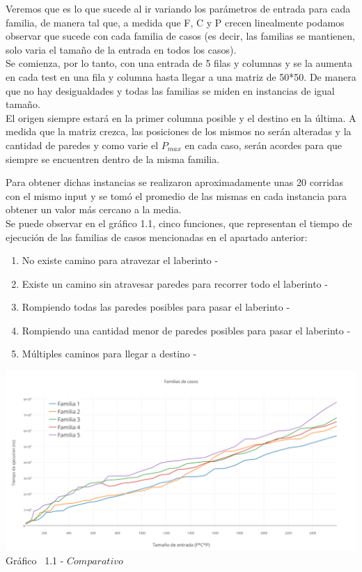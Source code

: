 \indent Veremos que es lo que sucede al ir variando los parámetros de entrada para cada familia, de manera tal que, a medida que F, C y P crecen linealmente podamos observar que sucede con cada familia de casos (es decir, las familias se mantienen, solo varia el tamaño de la entrada en todos los casos).\\
Se comienza, por lo tanto, con una entrada de 5 filas y columnas y se la aumenta en cada test en una fila y columna hasta llegar a una matriz de 50*50. De manera que no hay desigualdades y todas las familias se miden en instancias de igual tamaño.\\
El origen siempre estará en la primer columna posible y el destino en la última. A medida que la matriz crezca, las posiciones de los mismos no serán alteradas y la cantidad de paredes y como varie el $P_{max}$ en cada caso, serán acordes para que siempre se encuentren dentro de la misma familia.

Para obtener dichas instancias se realizaron aproximadamente unas 20 corridas con el mismo input y se tom\'o el promedio de las mismas en cada instancia para obtener un valor m\'as cercano a la media.\\ 



Se puede observar en el  gráfico 1.1, cinco funciones, que representan el tiempo de ejecuci\'on de las familias de casos mencionadas en el apartado anterior:\\

\begin{enumerate}
-\item No existe camino para atravezar el laberinto
-\item Existe un camino sin atravesar paredes para recorrer todo el laberinto
-\item Rompiendo todas las paredes posibles para pasar el laberinto
-\item Rompiendo una cantidad menor de paredes posibles para pasar el laberinto
-\item Múltiples caminos para llegar a destino
-\end{enumerate}

\vspace*{0.3cm} \vspace*{0.3cm}
  \begin{center}
 \includegraphics[scale=0.5]{./EJ1/comparativo.png}
 {Gr\'afico \ 1.1 - $Comparativo$}
  \end{center}
  \vspace*{0.3cm}
  
